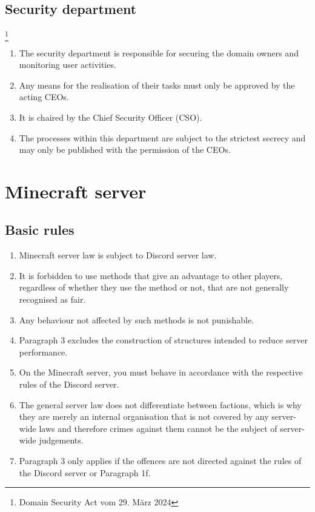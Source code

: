 \documentclass{article}
\begin{document}
\subsection{Security department}\footnote{Domain Security Act vom 29. März 2024}
\begin{enumerate}[(1)]
	\item The security department is responsible for securing the domain owners and monitoring user activities.
	\item Any means for the realisation of their tasks must only be approved by the acting CEOs.
	\item It is chaired by the Chief Security Officer (CSO).
	\item The processes within this department are subject to the strictest secrecy and may only be published with the permission of the CEOs.
\end{enumerate}

\section{Minecraft server}
\subsection{Basic rules}
\begin{enumerate}[(1)]
	\item Minecraft server law is subject to Discord server law.
	\item It is forbidden to use methods that give an advantage to other players, regardless of whether they use the method or not, that are not generally recognised as fair.
	\item Any behaviour not affected by such methods is not punishable.
	\item Paragraph 3 excludes the construction of structures intended to reduce server performance.
	\item On the Minecraft server, you must behave in accordance with the respective rules of the Discord server.
	\item The general server law does not differentiate between factions, which is why they are merely an internal organisation that is not covered by any server-wide laws and therefore crimes against them cannot be the subject of server-wide judgements.
	\item Paragraph 3 only applies if the offences are not directed against the rules of the Discord server or Paragraph 1f.
\end{enumerate}
\end{document}

